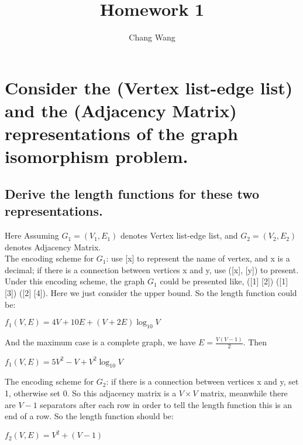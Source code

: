 \documentclass[12pt, a4paper]{report}
\title{Homework 1}
\author{Chang Wang}
\begin{document}
\maketitle

\section{Consider the (Vertex list-edge list) and the (Adjacency Matrix) representations of the graph isomorphism problem.}
\subsection{Derive the length functions for these two representations.}
Here Assuming $G_{1} = (V_{1}, E_{1})$ denotes Vertex list-edge list, and $G_{2} = (V_{2}, E_{2})$ denotes Adjacency Matrix. \\
The encoding scheme for $G_{1}$: use [x] to represent the name of vertex, and x is a decimal; if there is a connection between vertices x and y, use ([x], [y]) to present. Under this encoding scheme, the graph $G_{1}$ could be presented like, ([1] [2]) ([1] [3]) ([2] [4]). Here we just consider the upper bound. So the length function could be: \\
\begin{center}
$f_{1}(V, E) = 4V + 10E + (V+2E) \log_{10} V$
\end{center}
And the maximum case is a complete graph, we have $E = \frac {V(V-1)} {2}$. Then \\
\begin{center}
$f_{1}(V, E) = 5V^{2} - V + V^{2} \log_{10} V$
\end{center}
The encoding scheme for $G_{2}$: if there is a connection between vertices x and y, set 1, otherwise set 0. So this adjacency matrix is a $V \times V$ matrix, meanwhile there are $V - 1$ separators after each row in order to tell the length function this is an end of a row. So the length function should be: \\
\begin{center}
$f_{2}(V, E) = V^{2} + (V - 1)$
\end{center}
\end{document}
